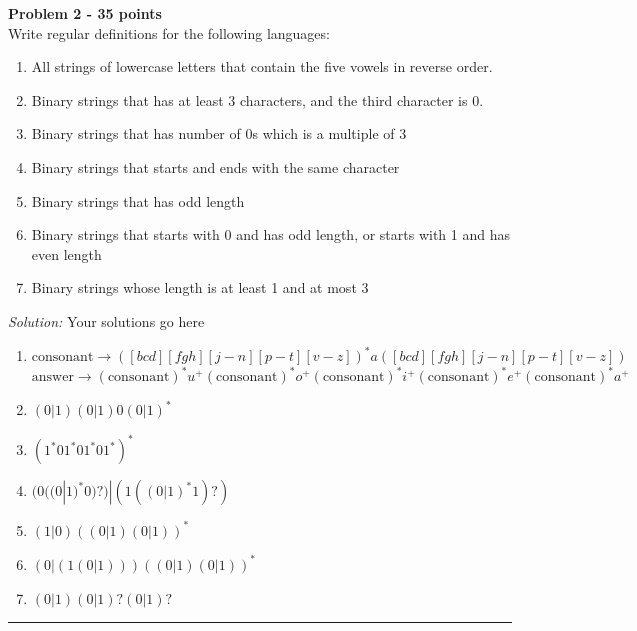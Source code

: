 \documentclass[a4paper, 11pt]{article}
\newenvironment{problem}[2][Problem]
    { \begin{mdframed}[backgroundcolor=gray!20] \textbf{#1 #2} \\}
    {  \end{mdframed}}
\newenvironment{solution}
    {\textit{Solution:}}
    {}
\begin{document}
\begin{problem}{2 - 35 points}
Write regular definitions for the following languages:

\begin{enumerate}[a]
    \item All strings of lowercase letters that contain the five vowels in reverse order.
    \item Binary strings that has at least 3 characters, and the third character is 0.
    \item Binary strings that has number of 0s which is a multiple of 3
    \item Binary strings that starts and ends with the same character
    \item Binary strings that has odd length
    \item Binary strings that starts with 0 and has odd length, or starts with 1 and has even length
    \item Binary strings whose length is at least 1 and at most 3

\end{enumerate}

\end{problem}
\begin{solution}
    Your solutions go here
    \begin{enumerate}[a]
        \item   $\text{consonant} \longrightarrow ([bcd][fgh][j-n][p-t][v-z])^*a([bcd][fgh][j-n][p-t][v-z])$\\
              $\text{answer} \longrightarrow (\text{consonant})^*u^+(\text{consonant})^*o^+(\text{consonant})^*i^+(\text{consonant})^*e^+(\text{consonant})^*a^+$
        \item   $(0|1)(0|1)0(0|1)^*$
        \item   $(1^*01^*01^*01^*)^*$
        \item   $(0((0|1)^*0)?)|(1((0|1)^*1)?)$
        \item   $(1|0)((0|1)(0|1))^*$
        \item   $(0|(1(0|1)))((0|1)(0|1))^*$
        \item   $(0|1)(0|1)?(0|1)?$

    \end{enumerate}
\end{solution}
\noindent\rule{7in}{2.8pt}

\end{document}
